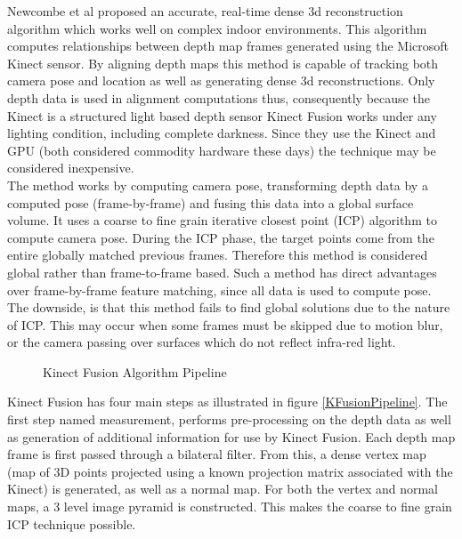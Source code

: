 Newcombe et al \cite{Newcombe11Kinectfusion} proposed an accurate, real-time dense 3d reconstruction algorithm which works well on complex indoor environments. This algorithm computes relationships between depth map frames generated using the Microsoft Kinect \cite{Zhang12Microsoft} sensor. By aligning depth maps this method is capable of tracking both camera pose and location as well as generating dense 3d reconstructions. Only depth data is used in alignment computations thus, consequently because the Kinect is a structured light based depth sensor Kinect Fusion works under any lighting condition, including complete darkness. Since they use the Kinect and GPU (both considered commodity hardware these days) the technique may be considered inexpensive. \\

The method works by computing camera pose, transforming depth data by a computed pose (frame-by-frame) and fusing this data into a global surface volume. It uses a coarse to fine grain iterative closest point (ICP) algorithm to compute camera pose. During the ICP phase, the target points come from the entire globally matched previous frames. Therefore this method is considered global rather than frame-to-frame based. Such a method has direct advantages over frame-by-frame feature matching, since all data is used to compute pose. The downside, is that this method fails to find global solutions due to the nature of ICP. This may occur when some frames must be skipped due to motion blur, or the camera passing over surfaces which do not reflect infra-red light. \\

\begin{figure}[!h]
\centering
\caption{Kinect Fusion Algorithm Pipeline \cite{Newcombe11Kinectfusion}}
\label{KFusionPipeliciteHne}
\end{figure}

Kinect Fusion has four main steps as illustrated in figure \ref{KFusionPipeline}. The first step named measurement, performs pre-processing on the depth data as well as generation of additional information for use by Kinect Fusion. Each depth map frame is first passed through a bilateral filter. From this, a dense vertex map (map of 3D points projected using a known projection matrix associated with the Kinect) is generated, as well as a normal map. For both the vertex and normal maps, a 3 level image pyramid is constructed. This makes the coarse to fine grain ICP technique possible. \\

